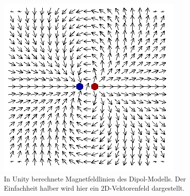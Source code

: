 \begin{figure}
  \includegraphics[width=0.75\columnwidth]{dipole-vector-field-unity}
  \caption{In Unity berechnete Magnetfeldlinien des Dipol-Modells. Der Einfachheit halber wird hier ein 2D-Vektorenfeld dargestellt.}
  \label{fig:dipole-vector-field-unity}
\end{figure}